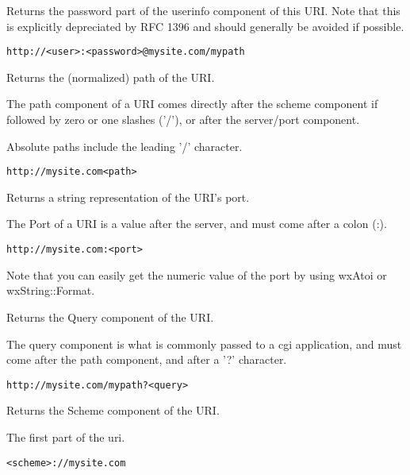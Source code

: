 Returns the password part of the userinfo component of
this URI.  Note that this is explicitly depreciated by
RFC 1396 and should generally be avoided if possible.

\tt{http://<user>:<password>@mysite.com/mypath}


\label{wxurigetpath}


Returns the (normalized) path of the URI.

The path component of a URI comes
directly after the scheme component
if followed by zero or one slashes ('/'),
or after the server/port component.

Absolute paths include the leading '/'
character.

\tt{http://mysite.com<path>}

\label{wxurigetport}


Returns a string representation of the URI's port.

The Port of a URI is a value after the server, and 
must come after a colon (:).

\tt{http://mysite.com:<port>}

Note that you can easily get the numeric value of the port
by using wxAtoi or wxString::Format.

\label{wxurigetquery}


Returns the Query component of the URI.

The query component is what is commonly passed to a 
cgi application, and must come after the path component,
and after a '?' character.

\tt{http://mysite.com/mypath?<query>}


\label{wxurigetscheme}


Returns the Scheme component of the URI.

The first part of the uri.

\tt{<scheme>://mysite.com}


\label{wxurigetserver}


